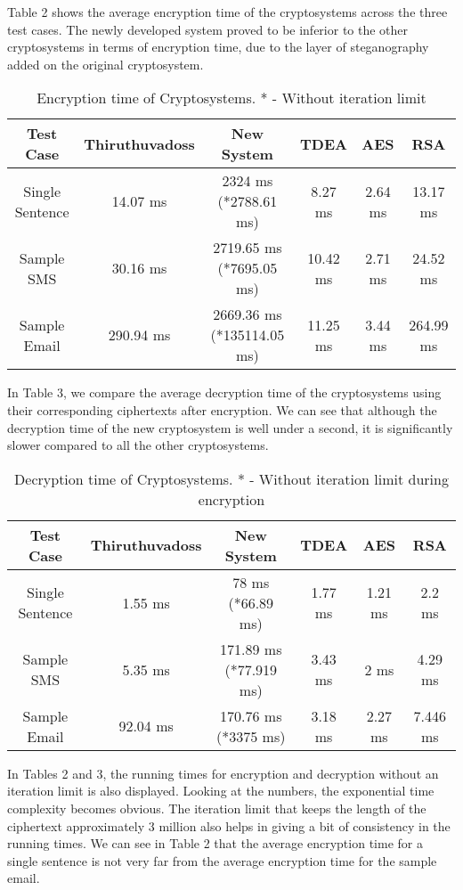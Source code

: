 Table 2 shows the average encryption time of the cryptosystems across the three test cases. The newly developed system proved to be inferior to the other cryptosystems in terms of encryption time, due to the layer of steganography added on the original cryptosystem.
\begin{table} [H]
\begin{tabular} {| c | c | c | c | c | c |}
    \hline
    Test Case & Thiruthuvadoss & New System & TDEA & AES & RSA \\
    \hline
    Single Sentence & 14.07 ms & 2324 ms (*2788.61 ms) & 8.27 ms & 2.64 ms & 13.17 ms \\
    \hline
    Sample SMS & 30.16 ms & 2719.65 ms (*7695.05 ms) & 10.42 ms & 2.71 ms & 24.52 ms \\
    \hline
    Sample Email & 290.94 ms & 2669.36 ms (*135114.05 ms) & 11.25 ms & 3.44 ms & 264.99 ms \\
    \hline
\end{tabular}
\caption{Encryption time of Cryptosystems. * - Without iteration limit}
\label{Table:2}
\end{table}

In Table 3, we compare the average decryption time of the cryptosystems using their corresponding ciphertexts after encryption. We can see that although the decryption time of the new cryptosystem is well under a second, it is significantly slower compared to all the other cryptosystems.
\begin{table} [H]
\begin{tabular} {| c | c | c | c | c | c |}
    \hline
    Test Case & Thiruthuvadoss & New System & TDEA & AES & RSA \\
    \hline
    Single Sentence & 1.55 ms & 78 ms (*66.89 ms) & 1.77 ms & 1.21 ms & 2.2 ms \\
    \hline
    Sample SMS & 5.35 ms & 171.89 ms (*77.919 ms) & 3.43 ms & 2 ms & 4.29 ms \\
    \hline
    Sample Email & 92.04 ms & 170.76 ms (*3375 ms) & 3.18 ms & 2.27 ms & 7.446 ms \\
    \hline
\end{tabular}
\caption{Decryption time of Cryptosystems. * - Without iteration limit during encryption}
\label{Table:3}
\end{table}

In Tables 2 and 3, the running times for encryption and decryption without an iteration limit is also displayed. Looking at the numbers, the exponential time complexity becomes obvious. The iteration limit that keeps the length of the ciphertext approximately 3 million also helps in giving a bit of consistency in the running times. We can see in Table 2 that the average encryption time for a single sentence is not very far from the average encryption time for the sample email.

